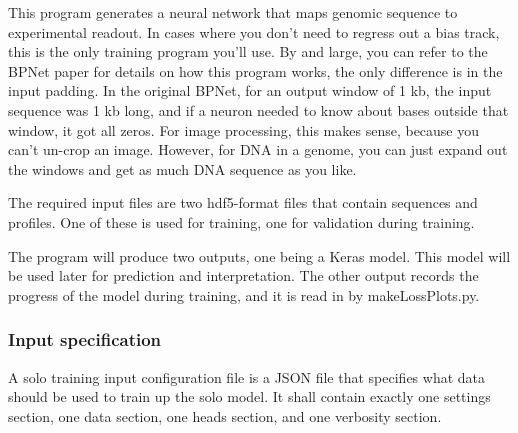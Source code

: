 \documentclass{article}
\begin{document}
This program generates a neural network that maps genomic sequence to experimental readout. 
In cases where you don't need to regress out a bias track, this is the only training program you'll use. 
By and large, you can refer to the BPNet paper for details on how this program works, the only difference is in the input padding. 
In the original BPNet, for an output window of 1 kb, the input sequence was 1 kb long, and if a neuron needed to know about bases outside that window, it got all zeros. 
For image processing, this makes sense, because you can't un-crop an image. However, for DNA in a genome, you can just expand out the windows and get as much DNA sequence as you like.

The required input files are two hdf5-format files that contain sequences and profiles. One of these is used for training, one for validation during training. 

The program will produce two outputs, one being a Keras model. This model will be used later for prediction and interpretation. The other output records the progress of the model during training, and it is read in by makeLossPlots.py. 


\subsubsection{Input specification}

A solo training input configuration file is a JSON file that specifies what data should be used to train up the solo model.
It shall contain exactly one settings section, one data section, one heads section, and one verbosity section. 
\end{document}
